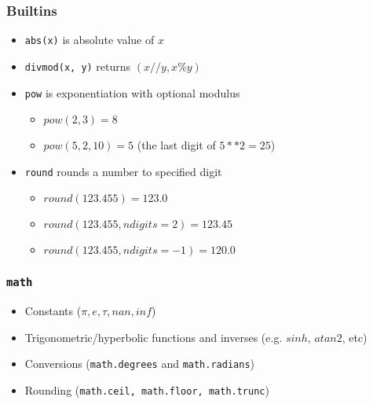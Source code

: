 \documentclass{beamer}
\begin{document}
\begin{frame}
  \frametitle{Builtins}

  \begin{itemize}
  \item \texttt{abs(x)} is absolute value of $x$
  \item \texttt{divmod(x, y)} returns $(x//y, x \% y)$
  \item \texttt{pow} is exponentiation with optional modulus
    \begin{itemize}
      \item $pow(2, 3) = 8$
      \item $pow(5, 2, 10) = 5$ (the last digit of $5**2=25$)
    \end{itemize}
  \item \texttt{round} rounds a number to specified digit
    \begin{itemize}
      \item $round(123.455) = 123.0$
      \item $round(123.455, ndigits=2) = 123.45$
      \item $round(123.455, ndigits=-1) = 120.0$
    \end{itemize}
  \end{itemize}
\end{frame}

\begin{frame}
  \frametitle{\texttt{math}}

  \begin{itemize}
    \item Constants ($\pi, e, \tau, nan, inf$)
    \item Trigonometric/hyperbolic functions and inverses (e.g. $sinh$, $atan2$, etc)
    \item Conversions (\texttt{math.degrees} and \texttt{math.radians})
    \item Rounding (\texttt{math.ceil, math.floor, math.trunc})
\end{itemize}
\end{frame}
\end{document}
